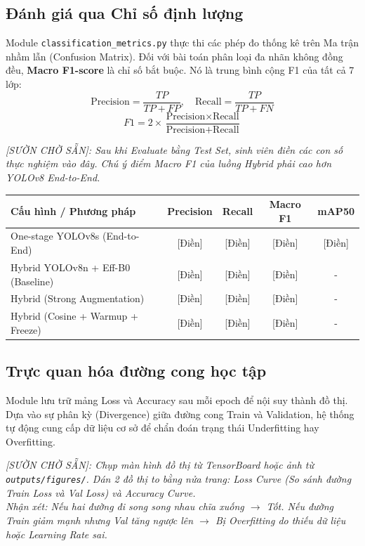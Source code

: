 \documentclass[12pt, a4paper]{article}
\begin{document}
\subsection{Đánh giá qua Chỉ số định lượng}
Module \texttt{classification\_metrics.py} thực thi các phép đo thống kê trên Ma trận nhầm lẫn (Confusion Matrix). Đối với bài toán phân loại đa nhãn không đồng đều, \textbf{Macro F1-score} là chỉ số bắt buộc. Nó là trung bình cộng F1 của tất cả 7 lớp:
\begin{equation}
    \text{Precision} = \frac{TP}{TP + FP}, \quad \text{Recall} = \frac{TP}{TP + FN}
\end{equation}
\begin{equation}
    F1 = 2 \times \frac{\text{Precision} \times \text{Recall}}{\text{Precision} + \text{Recall}}
\end{equation}

\begin{tcolorbox}[colback=yellow!10, colframe=red!75!black, title=YÊU CẦU BỔ SUNG ĐỂ ĐẠT 50 TRANG: BẢNG SO SÁNH ABLATION STUDY]
\textit{[SƯỜN CHỜ SẴN]: Sau khi Evaluate bằng Test Set, sinh viên điền các con số thực nghiệm vào đây. Chú ý điểm Macro F1 của luồng Hybrid phải cao hơn YOLOv8 End-to-End.}
\begin{table}[H]
\centering
\begin{tabular}{|l|c|c|c|c|}
\hline
\textbf{Cấu hình / Phương pháp} & \textbf{Precision} & \textbf{Recall} & \textbf{Macro F1} & \textbf{mAP50} \\
\hline
One-stage YOLOv8s (End-to-End) & [Điền] & [Điền] & [Điền] & [Điền] \\
Hybrid YOLOv8n + Eff-B0 (Baseline) & [Điền] & [Điền] & [Điền] & - \\
Hybrid (Strong Augmentation) & [Điền] & [Điền] & [Điền] & - \\
Hybrid (Cosine + Warmup + Freeze) & [Điền] & [Điền] & [Điền] & - \\
\hline
\end{tabular}
\end{table}
\end{tcolorbox}

\subsection{Trực quan hóa đường cong học tập}
Module lưu trữ mảng Loss và Accuracy sau mỗi epoch để nội suy thành đồ thị. Dựa vào sự phân kỳ (Divergence) giữa đường cong Train và Validation, hệ thống tự động cung cấp dữ liệu cơ sở để chẩn đoán trạng thái Underfitting hay Overfitting.
\begin{tcolorbox}[colback=yellow!10, colframe=red!75!black, title=YÊU CẦU BỔ SUNG ĐỂ ĐẠT 50 TRANG: BIỂU ĐỒ TENSORBOARD]
\textit{[SƯỜN CHỜ SẴN]: Chụp màn hình đồ thị từ TensorBoard hoặc ảnh từ \texttt{outputs/figures/}. Dán 2 đồ thị to bằng nửa trang: Loss Curve (So sánh đường Train Loss và Val Loss) và Accuracy Curve.}
\\ \textit{Nhận xét: Nếu hai đường đi song song nhau chĩa xuống $\rightarrow$ Tốt. Nếu đường Train giảm mạnh nhưng Val tăng ngược lên $\rightarrow$ Bị Overfitting do thiếu dữ liệu hoặc Learning Rate sai.}
\end{tcolorbox}
\end{document}
